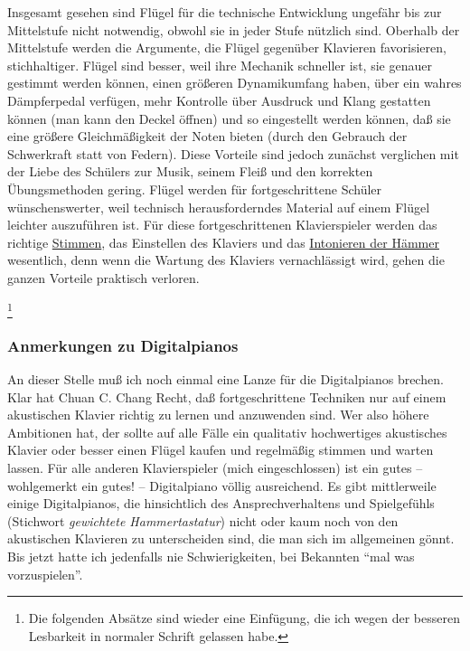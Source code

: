 Insgesamt gesehen sind Flügel für die technische Entwicklung ungefähr bis zur Mittelstufe nicht notwendig, obwohl sie in jeder Stufe nützlich sind.
Oberhalb der Mittelstufe werden die Argumente, die Flügel gegenüber Klavieren favorisieren, stichhaltiger.
Flügel sind besser, weil ihre Mechanik schneller ist, sie genauer gestimmt werden können, einen größeren Dynamikumfang haben, über ein wahres Dämpferpedal verfügen, mehr Kontrolle über Ausdruck und Klang gestatten können (man kann den Deckel öffnen) und so eingestellt werden können, daß sie eine größere Gleichmäßigkeit der Noten bieten (durch den Gebrauch der Schwerkraft statt von Federn).
Diese Vorteile sind jedoch zunächst verglichen mit der Liebe des Schülers zur Musik, seinem Fleiß und den korrekten Übungsmethoden gering.
Flügel werden für fortgeschrittene Schüler wünschenswerter, weil technisch herausforderndes Material auf einem Flügel leichter auszuführen ist.
Für diese fortgeschrittenen Klavierspieler werden das richtige \hyperref[c2_1]{Stimmen}, das Einstellen des Klaviers und das \hyperref[c2_7_hamm]{Intonieren der Hämmer} wesentlich, denn wenn die Wartung des Klaviers vernachlässigt wird, gehen die ganzen Vorteile praktisch verloren.
 

\label{c1iii17g}
\label{digital}

\footnote{Die folgenden Absätze sind wieder eine Einfügung, die ich wegen der besseren Lesbarkeit in normaler Schrift gelassen habe.}


\subsubsection{Anmerkungen zu Digitalpianos}

An dieser Stelle muß ich noch einmal eine Lanze für die Digitalpianos brechen.
Klar hat Chuan C. Chang Recht, daß fortgeschrittene Techniken nur auf einem akustischen Klavier richtig zu lernen und anzuwenden sind.
Wer also höhere Ambitionen hat, der sollte auf alle Fälle ein qualitativ hochwertiges akustisches Klavier oder besser einen Flügel kaufen und regelmäßig stimmen und warten lassen.
Für alle anderen Klavierspieler (mich eingeschlossen) ist ein gutes -- wohlgemerkt ein gutes! -- Digitalpiano völlig ausreichend.
Es gibt mittlerweile einige Digitalpianos, die hinsichtlich des Ansprechverhaltens und Spielgefühls (Stichwort \textit{gewichtete Hammertastatur}) nicht oder kaum noch von den akustischen Klavieren zu unterscheiden sind, die man sich im allgemeinen gönnt.
Bis jetzt hatte ich jedenfalls nie Schwierigkeiten, bei Bekannten \enquote{mal was vorzuspielen}.

